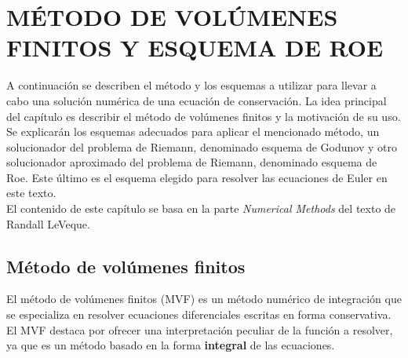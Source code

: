 \chapter{MÉTODO DE VOLÚMENES FINITOS Y ESQUEMA DE ROE}
A continuación se describen el método y los esquemas a utilizar para llevar a cabo una solución numérica de una ecuación de conservación. La idea principal del capítulo es describir el método de volúmenes finitos y la motivación de su uso. Se explicarán los esquemas adecuados para aplicar el mencionado método, un solucionador del problema de Riemann, denominado esquema de Godunov y otro solucionador aproximado del problema de Riemann, denominado esquema de Roe. Este último es el esquema elegido para resolver las ecuaciones de Euler en este texto.\\
El contenido de este capítulo se basa en la parte \textit{Numerical Methods} del texto \cite{Leveque} de Randall LeVeque.

\section{Método de volúmenes finitos}
El método de volúmenes finitos (MVF) es un método numérico de integración que se especializa en resolver ecuaciones diferenciales escritas en forma conservativa. El MVF destaca por ofrecer una interpretación peculiar de la función a resolver, ya que es un método basado en la forma \textbf{integral} de las ecuaciones.
